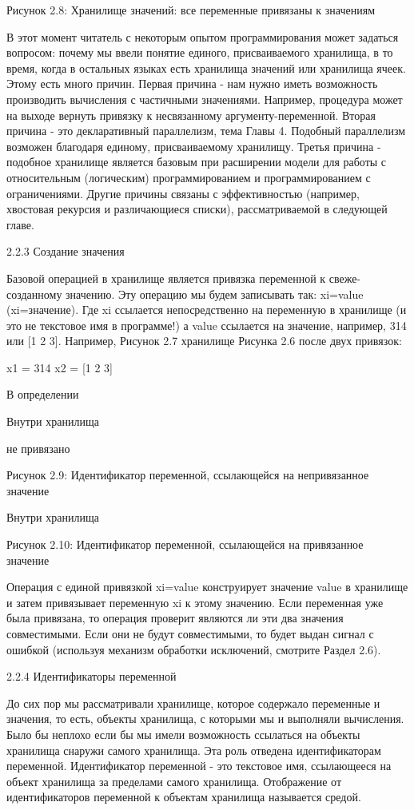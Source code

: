 Рисунок 2.8: Хранилище значений: все переменные привязаны к значениям

В этот момент читатель с некоторым опытом программирования может задаться вопросом: почему мы ввели понятие единого, присваиваемого хранилища, в то время, когда в остальных языках есть хранилища значений или хранилища ячеек. Этому есть много причин. Первая причина - нам нужно иметь возможность производить вычисления с частичными значениями. Например, процедура может на выходе вернуть привязку к несвязанному аргументу-переменной. Вторая причина - это декларативный параллелизм, тема Главы 4. Подобный параллелизм возможен благодаря единому, присваиваемому хранилищу. Третья причина - подобное хранилище является базовым при расширении модели для работы с относительным (логическим) программированием и программированием с ограничениями. Другие причины связаны с эффективностью (например, хвостовая рекурсия и различающиеся списки), рассматриваемой в следующей главе.

2.2.3 Создание значения

Базовой операцией в хранилище является привязка переменной к свеже-созданному значению. Эту операцию мы будем записывать так: xi=value (xi=значение). Где xi ссылается непосредственно на переменную в хранилище (и это не текстовое имя в программе!) а value ссылается на значение, например, 314 или [1 2 3]. Например, Рисунок 2.7 хранилище Рисунка 2.6 после двух привязок:

x1 = 314
x2 = [1 2 3]

В определении

Внутри хранилища

не привязано

Рисунок 2.9: Идентификатор переменной, ссылающейся на непривязанное значение

Внутри хранилища

Рисунок 2.10: Идентификатор переменной, ссылающейся на привязанное значение

Операция с единой привязкой xi=value конструирует значение value в хранилище и затем привязывает переменную xi к этому значению. Если переменная уже была привязана, то операция проверит являются ли эти два значения совместимыми. Если они не будут совместимыми, то будет выдан сигнал с ошибкой (используя механизм обработки исключений, смотрите Раздел 2.6).

2.2.4 Идентификаторы переменной

До сих пор мы рассматривали хранилище, которое содержало переменные и значения, то есть, объекты хранилища, с которыми мы и выполняли вычисления. Было бы неплохо если бы мы имели возможность ссылаться на объекты хранилища снаружи самого хранилища. Эта роль отведена идентификаторам переменной. Идентификатор переменной - это текстовое имя, ссылающееся на объект хранилища за пределами самого хранилища. Отображение от идентификаторов переменной к объектам хранилища называется средой.

